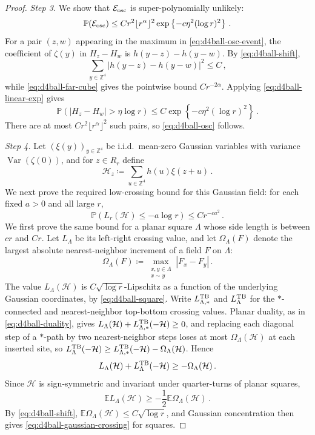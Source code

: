 \documentclass[11pt]{amsart}
\theoremstyle{plain}
\theoremstyle{definition}
\newcommand{\Z}{\mathbb{Z}}
\newcommand{\E}{\mathbb{E}}
\renewcommand{\P}{\mathbb{P}}
\DeclareMathOperator{\Var}{Var}
\begin{document}
\begin{proof}
\smallskip
\noindent\emph{Step 3.} We show that $\mathcal E_{\rm osc}$ is super-polynomially unlikely:
\begin{equation}\label{eq:d4ball-osc}
    \P(\mathcal E_{\rm osc})
    \leq
    Cr^2\lfloor r^\alpha\rfloor^2
    \exp\left\{-c\eta^2(\log r)^2\right\}\, .
\end{equation}
For a pair $(z,w)$ appearing in the maximum in
\eqref{eq:d4ball-osc-event}, the coefficient of $\zeta(y)$ in $H_z-H_w$ is
$h(y-z)-h(y-w)$. By
\eqref{eq:d4ball-shift},
\[
    \sum_{y\in\Z^4}|h(y-z)-h(y-w)|^2\leq C\, ,
\]
while
\eqref{eq:d4ball-far-cube} gives the pointwise bound $Cr^{-2\alpha}$.
Applying \eqref{eq:d4ball-linear-exp} gives
\[
    \P(|H_z-H_w|>\eta\log r)
    \leq
    C\exp\left\{-c\eta^2(\log r)^2\right\}\, .
\]
There are at most $Cr^2\lfloor r^\alpha\rfloor^2$ such pairs, so
\eqref{eq:d4ball-osc} follows.

\smallskip
\noindent\emph{Step 4.} Let $(\xi(y))_{y\in\Z^4}$ be i.i.d.\ mean-zero Gaussian variables with variance
	$\Var(\zeta(0))$, and for $z\in R_r$ define
	\[
	    \mathcal H_z\coloneqq\sum_{u\in\Z^4} h(u)\xi(z+u)\, .
	\]
We next prove the required low-crossing bound for this Gaussian field: for
each fixed $a>0$ and all large $r$,
\begin{equation}\label{eq:d4ball-gaussian-crossing}
    \P(L_r(\mathcal H)\leq-a\log r)\leq Cr^{-ca^2}\, .
\end{equation}
We first prove the same bound for a planar square $\Lambda$ whose side length is
between $cr$ and $Cr$. Let $L_\Lambda$ be its left-right crossing value, and let
$\Omega_\Lambda(F)$ denote the largest absolute nearest-neighbor increment of a field
$F$ on $\Lambda$:
\[
    \Omega_\Lambda(F)\coloneqq
    \max_{\substack{x,y\in\Lambda\\ x\sim y}} |F_x-F_y|\, .
\]
The
value $L_\Lambda(\mathcal H)$ is $C\sqrt{\log r}$-Lipschitz as a function of the
underlying Gaussian coordinates, by \eqref{eq:d4ball-square}. Write
$L_{\Lambda,\ast}^{\rm TB}$ and $L_\Lambda^{\rm TB}$ for the
$\ast$-connected and nearest-neighbor top-bottom crossing values. Planar
duality, as in \eqref{eq:d4ball-duality}, gives
$L_\Lambda(\mathcal H)+L_{\Lambda,\ast}^{\rm TB}(-\mathcal H)\geq0$,
and replacing each diagonal step of a $\ast$-path by two nearest-neighbor
steps loses at most $\Omega_\Lambda(\mathcal H)$ at each inserted site, so
$L_\Lambda^{\rm TB}(-\mathcal H)\geq
L_{\Lambda,\ast}^{\rm TB}(-\mathcal H)-\Omega_\Lambda(\mathcal H)$.
Hence
\[
    L_\Lambda(\mathcal H)+L_\Lambda^{\rm TB}(-\mathcal H)\geq-\Omega_\Lambda(\mathcal H)\, .
\]
Since $\mathcal H$ is sign-symmetric and invariant under
quarter-turns of planar squares,
\[
    \E L_\Lambda(\mathcal H)\geq-\frac12\E\Omega_\Lambda(\mathcal H)\, .
\]
By \eqref{eq:d4ball-shift}, $\E\Omega_\Lambda(\mathcal H)\leq C\sqrt{\log r}$, and Gaussian
concentration then gives \eqref{eq:d4ball-gaussian-crossing} for squares. 


\end{proof}
\end{document}
